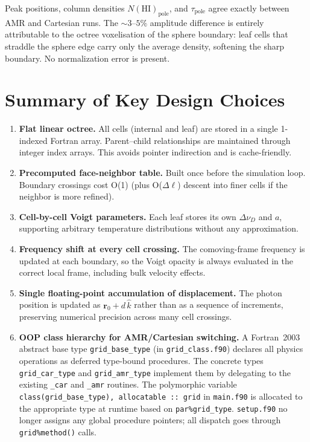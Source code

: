 \documentclass[english,a4paper]{my_memo}
\begin{document}
Peak positions, column densities $N(\mathrm{HI})_\mathrm{pole}$, and
$\tau_\mathrm{pole}$ agree exactly between AMR and Cartesian runs.  The
$\sim 3$--$5\%$ amplitude difference is entirely attributable to the
octree voxelisation of the sphere boundary: leaf cells that straddle the
sphere edge carry only the average density, softening the sharp boundary.
No normalization error is present.

\section{Summary of Key Design Choices}

\begin{enumerate}
  \item \textbf{Flat linear octree.}  All cells (internal and leaf) are stored
        in a single 1-indexed Fortran array.  Parent--child relationships are
        maintained through integer index arrays.  This avoids pointer
        indirection and is cache-friendly.

  \item \textbf{Precomputed face-neighbor table.}  Built once before the
        simulation loop.  Boundary crossings cost O(1) (plus O($\Delta\ell$)
        descent into finer cells if the neighbor is more refined).

  \item \textbf{Cell-by-cell Voigt parameters.}  Each leaf stores its own
        $\Delta\nu_D$ and $a$, supporting arbitrary temperature distributions
        without any approximation.

  \item \textbf{Frequency shift at every cell crossing.}  The comoving-frame
        frequency is updated at each boundary, so the Voigt opacity is always
        evaluated in the correct local frame, including bulk velocity effects.

  \item \textbf{Single floating-point accumulation of displacement.}  The
        photon position is updated as $\mathbf{r}_0 + d\,\hat{k}$ rather than
        as a sequence of increments, preserving numerical precision across
        many cell crossings.

  \item \textbf{OOP class hierarchy for AMR/Cartesian switching.}
        A Fortran~2003 abstract base type \texttt{grid\_base\_type} (in
        \texttt{grid\_class.f90}) declares all physics operations as deferred
        type-bound procedures.  The concrete types \texttt{grid\_car\_type}
        and \texttt{grid\_amr\_type} implement them by delegating to the
        existing \texttt{\_car} and \texttt{\_amr} routines.  The polymorphic
        variable \texttt{class(grid\_base\_type), allocatable :: grid} in
        \texttt{main.f90} is allocated to the appropriate type at runtime based
        on \texttt{par\%grid\_type}.  \texttt{setup.f90} no longer assigns any
        global procedure pointers; all dispatch goes through \texttt{grid\%method()}
        calls.


\end{enumerate}
\end{document}
